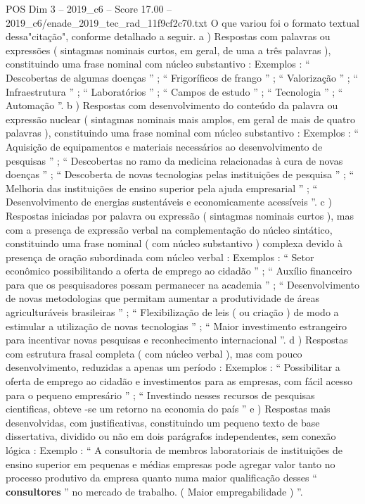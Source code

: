 \begin{textsample}{POS Dim 3 – 2019\_c6 – Score 17.00 – 2019\_c6/enade\_2019\_tec\_rad\_11f9cf2c70.txt}
O que variou foi o formato textual dessa"citação", conforme detalhado a seguir. a ) Respostas com palavras ou expressões ( sintagmas nominais curtos, em geral, de uma a três palavras ), constituindo uma frase nominal com núcleo substantivo : Exemplos : “ Descobertas de algumas doenças ” ; “ Frigoríficos de frango ” ; “ Valorização ” ; “ Infraestrutura ” ; “ Laboratórios ” ; “ Campos de estudo ” ; “ Tecnologia ” ; “ Automação ”. b ) Respostas com desenvolvimento do conteúdo da palavra ou expressão nuclear ( sintagmas nominais mais amplos, em geral de mais de quatro palavras ), constituindo uma frase nominal com núcleo substantivo : Exemplos : “ Aquisição de equipamentos e materiais necessários ao desenvolvimento de pesquisas ” ; “ Descobertas no ramo da medicina relacionadas à cura de novas doenças ” ; “ Descoberta de novas tecnologias pelas instituições de pesquisa ” ; “ Melhoria das instituições de ensino superior pela ajuda empresarial ” ; “ Desenvolvimento de energias sustentáveis e economicamente acessíveis ”. c ) Respostas iniciadas por palavra ou expressão ( sintagmas nominais curtos ), mas com a presença de expressão verbal na complementação do núcleo sintático, constituindo uma frase nominal ( com núcleo substantivo ) complexa devido à presença de oração subordinada com núcleo verbal : Exemplos : “ Setor econômico possibilitando a oferta de emprego ao cidadão ” ; “ Auxílio financeiro para que os pesquisadores possam permanecer na academia ” ; “ Desenvolvimento de novas metodologias que permitam aumentar a produtividade de áreas agriculturáveis brasileiras ” ; “ Flexibilização de leis ( ou criação ) de modo a estimular a utilização de novas tecnologias ” ; “ Maior investimento estrangeiro para incentivar novas pesquisas e reconhecimento internacional ”. d ) Respostas com estrutura frasal completa ( com núcleo verbal ), mas com pouco desenvolvimento, reduzidas a apenas um período : Exemplos : “ Possibilitar a oferta de emprego ao cidadão e investimentos para as empresas, com fácil acesso para o pequeno empresário ” ; “ Investindo nesses recursos de pesquisas cientificas, obteve -se um retorno na economia do país ” e ) Respostas mais desenvolvidas, com justificativas, constituindo um pequeno texto de base dissertativa, dividido ou não em dois parágrafos independentes, sem conexão lógica : Exemplo : “ A consultoria de membros laboratoriais de instituições de ensino superior em pequenas e médias empresas pode agregar valor tanto no processo produtivo da empresa quanto numa maior qualificação desses “ \textbf{consultores} ” no mercado de trabalho. ( Maior empregabilidade ) ”.

\end{textsample}
